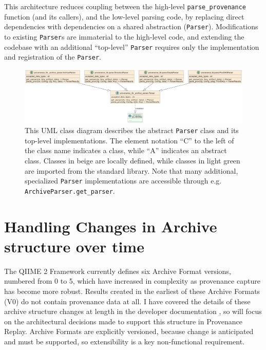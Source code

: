 This architecture reduces coupling between the high-level \texttt{parse\_provenance}
function (and its callers), and the low-level parsing code, by replacing direct
dependencies with dependencies on a shared abstraction (\texttt{Parser}). Modifications
to existing \texttt{Parser}s are immaterial to the high-level code, and extending the
codebase with an additional “top-level” \texttt{Parser} requires only the implementation
and registration of the \texttt{Parser}. 

\begin{figure}[htp]
\centering
\includegraphics[width=\textwidth]{figures/allParsersUML.png}
\caption[UML Class diagram of the abstract Parser class and its implementations]%
{This UML class diagram describes the abstract \texttt{Parser} class and its top-level
implementations. The element notation “C” to the left of the class name
indicates a class, while “A” indicates an abstract class. Classes in beige are
locally defined, while classes in light green are imported from the standard
library. Note that many additional, specialized \texttt{Parser} implementations are
accessible through e.g. \texttt{ArchiveParser.get\_parser}.}
\label{fig:allParsersUML}
\end{figure}


\section{Handling Changes in Archive structure over time}
\label{section:archive_versions}

The QIIME 2 Framework currently defines six Archive Format versions, numbered from 0 to 5,
which have increased in complexity as provenance capture has become more robust.
Results created in the earliest of these Archive Formats (V0) do not contain
provenance data at all. I have covered the details of these archive structure
changes at length in the developer documentation \parencite{qiime_2_development_team_archive_2018},
so will focus on the architectural decisions made to support this structure in
Provenance Replay. Archive Formats are explicitly versioned, because change is
anticipated and must be supported, so extensibility is a key non-functional
requirement.

